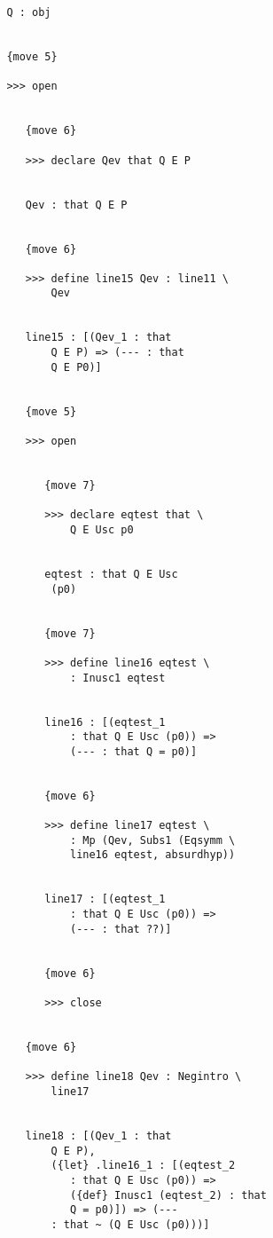 \documentclass[12pt]{article}
\begin{document}
\begin{verbatim}
               Q : obj


               {move 5}

               >>> open


                  {move 6}

                  >>> declare Qev that Q E P


                  Qev : that Q E P


                  {move 6}

                  >>> define line15 Qev : line11 \
                      Qev


                  line15 : [(Qev_1 : that 
                      Q E P) => (--- : that 
                      Q E P0)]


                  {move 5}

                  >>> open


                     {move 7}

                     >>> declare eqtest that \
                         Q E Usc p0


                     eqtest : that Q E Usc 
                      (p0)


                     {move 7}

                     >>> define line16 eqtest \
                         : Inusc1 eqtest


                     line16 : [(eqtest_1 
                         : that Q E Usc (p0)) => 
                         (--- : that Q = p0)]


                     {move 6}

                     >>> define line17 eqtest \
                         : Mp (Qev, Subs1 (Eqsymm \
                         line16 eqtest, absurdhyp))


                     line17 : [(eqtest_1 
                         : that Q E Usc (p0)) => 
                         (--- : that ??)]


                     {move 6}

                     >>> close


                  {move 6}

                  >>> define line18 Qev : Negintro \
                      line17


                  line18 : [(Qev_1 : that 
                      Q E P), 
                      ({let} .line16_1 : [(eqtest_2 
                         : that Q E Usc (p0)) => 
                         ({def} Inusc1 (eqtest_2) : that 
                         Q = p0)]) => (--- 
                      : that ~ (Q E Usc (p0)))]



\end{verbatim}
\end{document}
